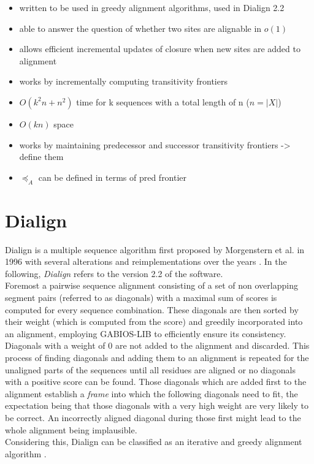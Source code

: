 \begin{itemize}
	\item written to be used in greedy alignment algorithms, used in Dialign 2.2
	\item able to answer the question of whether two sites are alignable in $o(1)$
	\item allows efficient incremental updates of closure when new sites are added to alignment 
	\item works by incrementally computing transitivity frontiers
	\item $O(k^2n+n^2)$ time for k sequences with a total length of n ($n = |X|$)
	\item $O(kn)$ space
	\item works by maintaining predecessor and successor transitivity frontiers -> define them
	\item $\preceq_A$ can be defined in terms of pred frontier

\end{itemize}
 


\section{Dialign}
Dialign is a multiple sequence algorithm first proposed by Morgenstern et al. in 1996 \cite{morgenstern1996multiple} with several alterations and reimplementations over the years  \cite{abdeddaim2000speeding, morgenstern1999dialign, sub:wey:kau:mor:05, sub:kau:mor:08, morgenstern2004dialign}. In the following, \textit{Dialign} refers to the version 2.2 \cite{morgenstern2004dialign} of the software.\\
Foremost a pairwise sequence alignment consisting of a set of non overlapping segment pairs (referred to as diagonals) with a maximal sum of scores is computed for every sequence combination. These diagonals are then sorted by their weight (which is computed from the score) and greedily incorporated into an alignment, employing GABIOS-LIB to efficiently ensure its consistency. Diagonals with a weight of 0 are not added to the alignment and discarded. This process of finding diagonals and adding them to an alignment is repeated for the unaligned parts of the sequences until all residues are aligned or no diagonals with a positive score can be found. Those diagonals which are added first to the alignment establish a \textit{frame} into which the following diagonals need to fit, the expectation being that those diagonals with a very high weight are very likely to be correct. An incorrectly aligned diagonal during those first might lead to the whole alignment being implausible.\\
Considering this, Dialign can be classified as an iterative and greedy alignment algorithm \cite{morgenstern1996multiple}.


